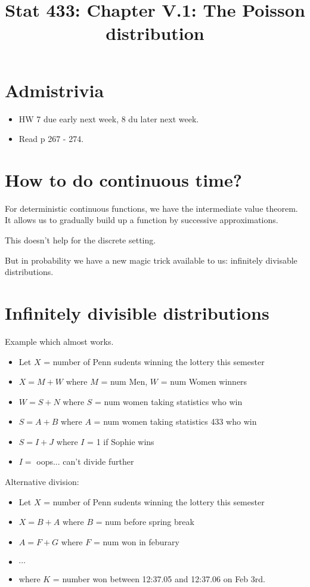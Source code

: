 \documentclass[20pt]{extarticle}
\begin{document}
\title{Stat 433: Chapter V.1: The Poisson distribution}

\section{Admistrivia}
\begin{itemize}
\item  HW 7 due early next week, 8 du later next week.
\item Read p 267 - 274.
\end{itemize}

\newpage

\section{How to do continuous time?}

For deterministic continuous functions, we have the intermediate value
 theorem.  It allows us to gradually build up a function by successive
approximations. 

This doesn't help for the discrete setting.

But in probability we have a new magic trick available to us:
 \cite{http://en.wikipedia.org/wiki/Infinite_divisibility_(probability)}{infinitely
 divisable distributions.}

\section{Infinitely divisible distributions}

Example which almost works.
\begin{itemize}
\item Let $X$ = number of Penn sudents winning the lottery this semester
\item $X = M+W$ where $M$ = num Men, $W$ = num Women winners
\item $W = S+N$ where $S$ = num women taking statistics who win
\item $S = A + B$ where $A$ = num women taking statistics 433 who win
\item $S = I + J$ where $I$ = 1 if Sophie wins
\item $I = $ oops... can't divide further
\end{itemize}

\newpage

Alternative division:
\begin{itemize}
\item Let $X$ = number of Penn sudents winning the lottery this semester
\item $X = B+A$ where $B$ = num before spring break
\item $A = F+G$ where $F$ = num won in feburary
\item $\cdots$
\item where $K$ = number won between 12:37.05 and 12:37.06 on Feb 3rd.
\end{itemize}
\newpage
\end{document}
